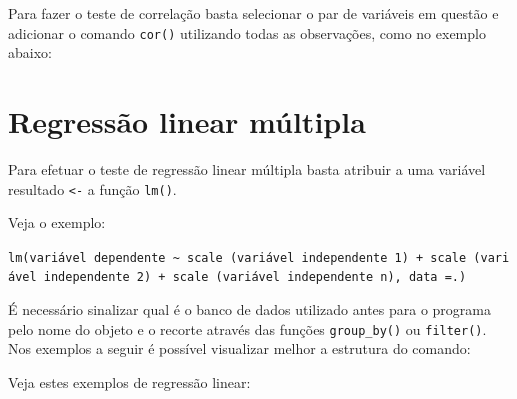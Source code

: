 \documentclass[
  10pt,
  brazil,
  a4paper,
  twoside, notitlepage, openright]{book}
\newenvironment{Shaded}{\begin{snugshade}}{\end{snugshade}}
\newcommand{\CommentTok}[1]{\textcolor[rgb]{0.56,0.35,0.01}{\textit{#1}}}
\newcommand{\DataTypeTok}[1]{\textcolor[rgb]{0.13,0.29,0.53}{#1}}
\newcommand{\KeywordTok}[1]{\textcolor[rgb]{0.13,0.29,0.53}{\textbf{#1}}}
\newcommand{\NormalTok}[1]{#1}
\newcommand{\OperatorTok}[1]{\textcolor[rgb]{0.81,0.36,0.00}{\textbf{#1}}}
\newcommand{\StringTok}[1]{\textcolor[rgb]{0.31,0.60,0.02}{#1}}
\begin{document}
Para fazer o teste de correlação basta selecionar o par de variáveis em questão e adicionar o comando \texttt{cor()} utilizando todas as observações, como no exemplo abaixo:

\begin{Shaded}
\end{Shaded}

\hypertarget{regressuxe3o-linear-muxfaltipla}{%
\section{Regressão linear múltipla}\label{regressuxe3o-linear-muxfaltipla}}

Para efetuar o teste de regressão linear múltipla basta atribuir a uma variável resultado \texttt{\textless{}-} a função \texttt{lm()}.

Veja o exemplo:

\texttt{lm(variável\ dependente\ \textasciitilde{}\ scale\ (variável\ independente\ 1)\ +\ scale\ (variável\ independente\ 2)\ +\ scale\ (variável\ independente\ n),\ data\ =.)}

É necessário sinalizar qual é o banco de dados utilizado antes para o programa pelo nome do objeto e o recorte através das funções \texttt{group\_by()} ou \texttt{filter()}. Nos exemplos a seguir é possível visualizar melhor a estrutura do comando:

Veja estes exemplos de regressão linear:
\end{document}

